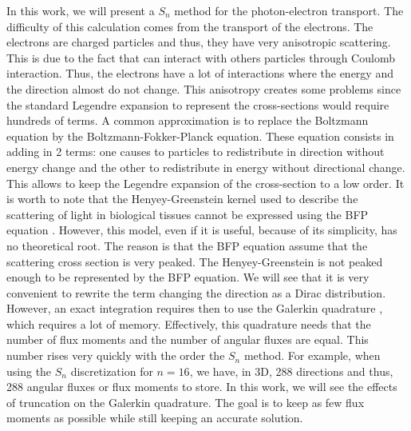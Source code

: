 In this work, we will present a $S_n$ method for the photon-electron
transport. The difficulty of this calculation comes from the transport of the
electrons. The electrons are charged particles and thus, they have very
anisotropic scattering. This is due to the fact that can interact with others
particles through Coulomb interaction. Thus, the electrons have a lot of
interactions where the energy and the direction almost do not change. This 
anisotropy creates some problems since the standard Legendre expansion to represent 
the cross-sections would require hundreds of terms. A common approximation is to 
replace the Boltzmann equation by the Boltzmann-Fokker-Planck equation. These 
equation consists in adding in 2 terms: one causes to particles to redistribute in 
direction without energy change and the other to redistribute in energy without 
directional change\cite{morel_81}. This allows to keep the Legendre expansion of the 
cross-section to a low order. It is worth to note that the Henyey-Greenstein kernel
used to describe the scattering of light in biological tissues cannot be
expressed using the BFP equation \cite{larsen}. However, this model, even if
it is useful, because of its simplicity, has no theoretical root. The reason
is that the BFP equation assume that the scattering cross section is very
peaked. The Henyey-Greenstein is not peaked enough to be represented by the
BFP equation. We will see that it is very convenient to rewrite the term changing 
the direction as a Dirac distribution. However, an exact integration requires then to use the Galerkin quadrature \cite{graal}, which requires a lot of memory. 
Effectively, this quadrature needs that the number of flux moments and the
number of angular fluxes are equal. This number rises very quickly with the
order the $S_n$ method. For example, when using the $S_n$ discretization for $n=16$, 
we have, in 3D, 288 directions and thus, 288 angular fluxes or flux moments to
store. In this work, we will see the effects of truncation on the Galerkin
quadrature. The goal is to keep as few flux moments as possible while still
keeping an accurate solution.
